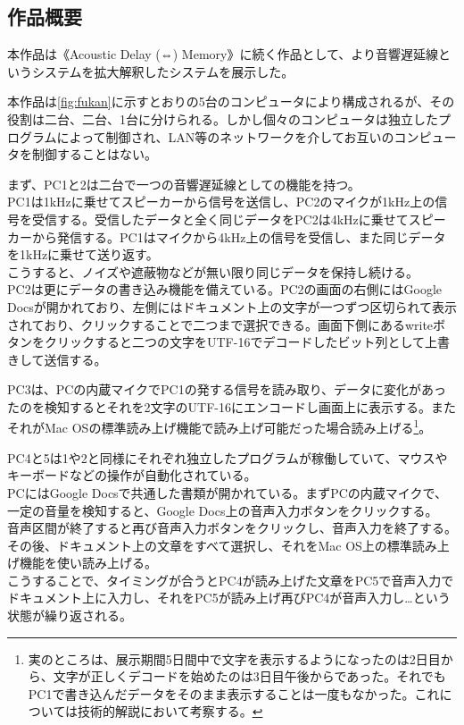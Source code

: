 \documentclass[a4paper,report]{jsbook}
\begin{document}
\subsection{作品概要}\label{ux4f5cux54c1ux6982ux8981-2}

本作品は《Acoustic Delay (⇔)
Memory》に続く作品として、より音響遅延線というシステムを拡大解釈したシステムを展示した。

本作品は\cref{fig:fukan}に示すとおりの5台のコンピュータにより構成されるが、その役割は二台、二台、1台に分けられる。しかし個々のコンピュータは独立したプログラムによって制御され、LAN等のネットワークを介してお互いのコンピュータを制御することはない。

まず、PC1と2は二台で一つの音響遅延線としての機能を持つ。\\
PC1は1kHzに乗せてスピーカーから信号を送信し、PC2のマイクが1kHz上の信号を受信する。受信したデータと全く同じデータをPC2は4kHzに乗せてスピーカーから発信する。PC1はマイクから4kHz上の信号を受信し、また同じデータを1kHzに乗せて送り返す。\\
こうすると、ノイズや遮蔽物などが無い限り同じデータを保持し続ける。\\
PC2は更にデータの書き込み機能を備えている。PC2の画面の右側にはGoogle
Docsが開かれており、左側にはドキュメント上の文字が一つずつ区切られて表示されており、クリックすることで二つまで選択できる。画面下側にあるwriteボタンをクリックすると二つの文字をUTF-16でデコードしたビット列として上書きして送信する。

PC3は、PCの内蔵マイクでPC1の発する信号を読み取り、データに変化があったのを検知するとそれを2文字のUTF-16にエンコードし画面上に表示する。またそれがMac
OSの標準読み上げ機能で読み上げ可能だった場合読み上げる\footnote{実のところは、展示期間5日間中で文字を表示するようになったのは2日目から、文字が正しくデコードを始めたのは3日目午後からであった。それでもPC1で書き込んだデータをそのまま表示することは一度もなかった。これについては技術的解説において考察する。}。

PC4と5は1や2と同様にそれぞれ独立したプログラムが稼働していて、マウスやキーボードなどの操作が自動化されている。\\
PCにはGoogle
Docsで共通した書類が開かれている。まずPCの内蔵マイクで、一定の音量を検知すると、Google
Docs上の音声入力ボタンをクリックする。\\
音声区間が終了すると再び音声入力ボタンをクリックし、音声入力を終了する。その後、ドキュメント上の文章をすべて選択し、それをMac
OS上の標準読み上げ機能を使い読み上げる。\\
こうすることで、タイミングが合うとPC4が読み上げた文章をPC5で音声入力でドキュメント上に入力し、それをPC5が読み上げ再びPC4が音声入力し\ldots{}という状態が繰り返される。
\end{document}
